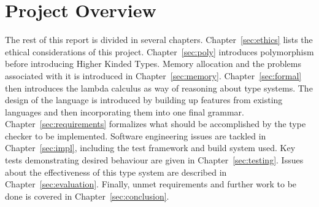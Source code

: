 \section{Project Overview}
The rest of this report is divided in several chapters.
Chapter~\ref{sec:ethics} lists the ethical considerations of this project.
Chapter~\ref{sec:poly} introduces polymorphism before introducing Higher Kinded
Types. Memory allocation and the problems associated with it is introduced in
Chapter~\ref{sec:memory}.  Chapter~\ref{sec:formal} then introduces the lambda
calculus as way of reasoning about type systems. The design of the language is
introduced by building up features from existing languages and then
incorporating them into one final grammar.  Chapter~\ref{sec:requirements}
formalizes what should be accomplished by the type checker to be implemented.
Software engineering issues are tackled in Chapter~\ref{sec:impl}, including
the test framework and build system used. Key tests demonstrating desired
behaviour are given in Chapter~\ref{sec:testing}. Issues about the
effectiveness of this type system are described in
Chapter~\ref{sec:evaluation}. Finally, unmet requirements and further work to
be done is covered in Chapter~\ref{sec:conclusion}.
